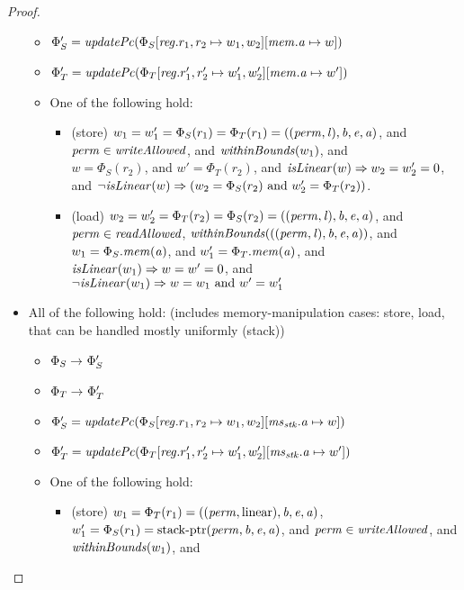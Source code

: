 \begin{proof}
\begin{itemize}
\begin{itemize}
  \item $\Phi_S' =
    \updPcAddr{\Phi_S\updReg{r_1,r_2}{w_1,w_2}\update{\mem.\aaddr}{w}}$
  \item $\Phi_T' =
    \updPcAddr{\Phi_T\updReg{r_1',r_2'}{w_1',w_2'}\update{\mem.\aaddr}{w'}}$
  \item One of the following hold:
    \begin{itemize}
    \item (store) $w_1 = w_1' = \Phi_S(r_1) = \Phi_T(r_1) =
      ((\mathit{perm},\mathit{l}),\mathit{b},\mathit{e},\mathit{a})$, and $\perm \in \writeAllowed{}$,
      and
      $\withinBounds{w_1}$, and\\
      $w = \Phi_S(r_2)$, and $w' = \Phi_T(r_2)$, and $\isLinear{w} \Rightarrow
      w_2 = w_2' = 0$, and $\neg \isLinear{w} \Rightarrow (w_2 = \Phi_S(r_2)
      \text{ and } w_2' = \Phi_T(r_2))$.
    \item (load) $w_2 = w_2' = \Phi_T(r_2) = \Phi_S(r_2) =
      ((\mathit{perm},\mathit{l}),\mathit{b},\mathit{e},\mathit{a})$, and $\perm \in \readAllowed{}$,
      $\withinBounds{((\perm,\lin),\baddr,\eaddr,\aaddr)}$, and \\
      $w_1 = \Phi_S.\mathit{mem}(\mathit{a})$, and $w_1' = \Phi_T.\mathit{mem}(\mathit{a})$, and \\
      $\isLinear{w_1} \Rightarrow w = w' = 0$, and \\
      $\neg \isLinear{w_1} \Rightarrow w = w_1 \text{ and } w' = w_1'$
    \end{itemize}
  \end{itemize}
\item All of the following hold: (includes memory-manipulation cases: store, load, that can be handled mostly uniformly (stack))
  \begin{itemize}
  \item $\Phi_S \rightarrow^{} \Phi_S'$
  \item $\Phi_T \rightarrow^{} \Phi_T'$
  \item $\Phi_S' =
    \updPcAddr{\Phi_S\updReg{r_1,r_2}{w_1,w_2}\update{\ms_\stk.\aaddr}{w}}$
  \item $\Phi_T' =
    \updPcAddr{\Phi_T\updReg{r_1',r_2'}{w_1',w_2'}\update{\ms_\stk.\aaddr}{w'}}$
  \item One of the following hold:
    \begin{itemize}
    \item (store) $w_1 = \Phi_T(r_1) = ((\mathit{perm},\mathrm{linear}),\mathit{b},\mathit{e},\mathit{a})$, $w_1' =  \Phi_S(r_1) = \mathrm{stack\text{-}ptr}(\mathit{perm},\mathit{b},\mathit{e},\mathit{a})$, and $\perm \in \writeAllowed{}$,
      and
      $\withinBounds{w_1}$, and\\

\end{itemize}
\end{itemize}
\end{itemize}
\end{proof}
